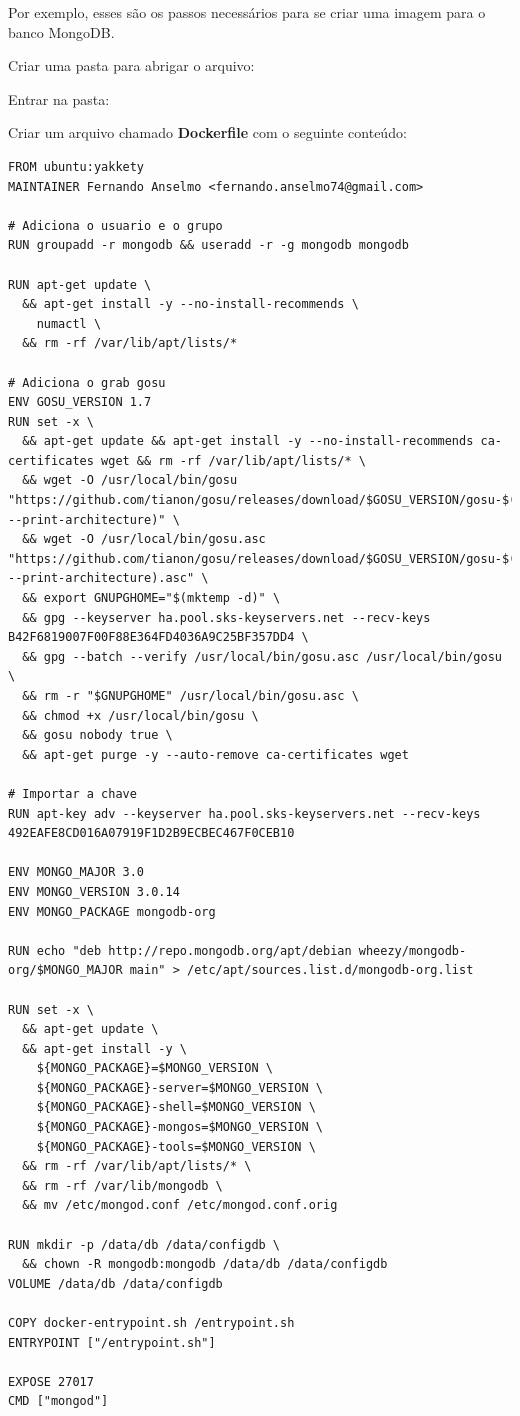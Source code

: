 \documentclass[a4paper,11pt]{article}
\begin{document}
Por exemplo, esses são os passos necessários para se criar uma imagem para o banco MongoDB.

Criar uma pasta para abrigar o arquivo: \\

Entrar na pasta: \\

Criar um arquivo chamado \textbf{Dockerfile} com o seguinte conteúdo:
\begin{lstlisting}[]
FROM ubuntu:yakkety
MAINTAINER Fernando Anselmo <fernando.anselmo74@gmail.com>

# Adiciona o usuario e o grupo
RUN groupadd -r mongodb && useradd -r -g mongodb mongodb

RUN apt-get update \
  && apt-get install -y --no-install-recommends \
    numactl \
  && rm -rf /var/lib/apt/lists/*

# Adiciona o grab gosu
ENV GOSU_VERSION 1.7
RUN set -x \
  && apt-get update && apt-get install -y --no-install-recommends ca-certificates wget && rm -rf /var/lib/apt/lists/* \
  && wget -O /usr/local/bin/gosu "https://github.com/tianon/gosu/releases/download/$GOSU_VERSION/gosu-$(dpkg --print-architecture)" \
  && wget -O /usr/local/bin/gosu.asc "https://github.com/tianon/gosu/releases/download/$GOSU_VERSION/gosu-$(dpkg --print-architecture).asc" \
  && export GNUPGHOME="$(mktemp -d)" \
  && gpg --keyserver ha.pool.sks-keyservers.net --recv-keys B42F6819007F00F88E364FD4036A9C25BF357DD4 \
  && gpg --batch --verify /usr/local/bin/gosu.asc /usr/local/bin/gosu \
  && rm -r "$GNUPGHOME" /usr/local/bin/gosu.asc \
  && chmod +x /usr/local/bin/gosu \
  && gosu nobody true \
  && apt-get purge -y --auto-remove ca-certificates wget

# Importar a chave
RUN apt-key adv --keyserver ha.pool.sks-keyservers.net --recv-keys 492EAFE8CD016A07919F1D2B9ECBEC467F0CEB10

ENV MONGO_MAJOR 3.0
ENV MONGO_VERSION 3.0.14
ENV MONGO_PACKAGE mongodb-org

RUN echo "deb http://repo.mongodb.org/apt/debian wheezy/mongodb-org/$MONGO_MAJOR main" > /etc/apt/sources.list.d/mongodb-org.list

RUN set -x \
  && apt-get update \
  && apt-get install -y \
    ${MONGO_PACKAGE}=$MONGO_VERSION \
    ${MONGO_PACKAGE}-server=$MONGO_VERSION \
    ${MONGO_PACKAGE}-shell=$MONGO_VERSION \
    ${MONGO_PACKAGE}-mongos=$MONGO_VERSION \
    ${MONGO_PACKAGE}-tools=$MONGO_VERSION \
  && rm -rf /var/lib/apt/lists/* \
  && rm -rf /var/lib/mongodb \
  && mv /etc/mongod.conf /etc/mongod.conf.orig

RUN mkdir -p /data/db /data/configdb \
  && chown -R mongodb:mongodb /data/db /data/configdb
VOLUME /data/db /data/configdb

COPY docker-entrypoint.sh /entrypoint.sh
ENTRYPOINT ["/entrypoint.sh"]

EXPOSE 27017
CMD ["mongod"]
\end{lstlisting}
\end{document}
